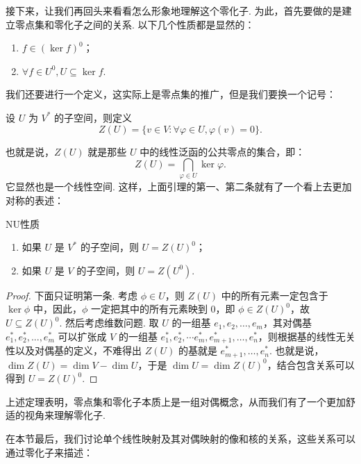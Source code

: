 接下来，让我们再回头来看看怎么形象地理解这个零化子. 为此，首先要做的是建立零点集和零化子之间的关系. 以下几个性质都是显然的：

\begin{lemma}{}{}
    \begin{enumerate}
        \item $f \in (\ker f)^0$；
        \item $\forall f \in U^0, U \subseteq \ker f$.
    \end{enumerate}
\end{lemma}

我们还要进行一个定义，这实际上是零点集的推广，但是我们要换一个记号：

\begin{definition}{}{}
    设 $U$ 为 $V^*$ 的子空间，则定义
    \[
        Z(U) = \{v \in V: \forall \varphi \in U, \varphi(v) = 0\}.
    \]
\end{definition}

也就是说，$Z(U)$ 就是那些 $U$ 中的线性泛函的公共零点的集合，即：
\[
    Z(U) = \bigcap_{\varphi \in U} \ker \varphi.
\]
它显然也是一个线性空间. 这样，上面引理的第一、第二条就有了一个看上去更加对称的表述：

\begin{theorem}{}{NU性质}
    \begin{enumerate}
        \item 如果 $U$ 是 $V^*$ 的子空间，则 $U = Z(U)^0$；
        \item 如果 $U$ 是 $V$ 的子空间，则 $U = Z(U^0)$.
    \end{enumerate}
\end{theorem}

\begin{proof}
    下面只证明第一条. 考虑 $\phi \in U$，则 $Z(U)$ 中的所有元素一定包含于 $\ker \phi$ 中，因此，$\phi$ 一定把其中的所有元素映到 $0$，即 $\phi \in Z(U)^0$，故 $U \subseteq Z(U)^0$. 然后考虑维数问题. 取 $U$ 的一组基 $e_1, e_2,\ldots, e_m$，其对偶基 $e_1^*, e_2^*, ..., e_m^*$ 可以扩张成 $V$ 的一组基 $e_1^*, e_2^*, \cdots e_m^*, e_{m + 1}^*,\ldots, e_n^*$，则根据基的线性无关性以及对偶基的定义，不难得出 $Z(U)$ 的基就是 $e_{m + 1}^*,\ldots, e_n^*$. 也就是说，$\dim Z(U) = \dim V - \dim U$，于是 $\dim U = \dim Z(U)^0$，结合包含关系可以得到 $U = Z(U)^0$.
\end{proof}

上述定理表明，零点集和零化子本质上是一组对偶概念，从而我们有了一个更加舒适的视角来理解零化子.

在本节最后，我们讨论单个线性映射及其对偶映射的像和核的关系，这些关系可以通过零化子来描述：

